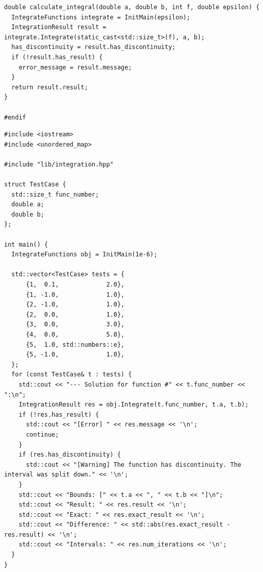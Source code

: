 \begin{lstlisting}[caption=Файл \texttt{integration.hpp}]
double calculate_integral(double a, double b, int f, double epsilon) {
  IntegrateFunctions integrate = InitMain(epsilon);
  IntegrationResult result = integrate.Integrate(static_cast<std::size_t>(f), a, b);
  has_discontinuity = result.has_discontinuity;
  if (!result.has_result) {
    error_message = result.message;
  }
  return result.result;
}

#endif
\end{lstlisting}

\begin{lstlisting}[caption=Файл \texttt{main.cpp}]
#include <iostream>
#include <unordered_map>

#include "lib/integration.hpp"

struct TestCase {
  std::size_t func_number;
  double a;
  double b;
};

int main() {
  IntegrateFunctions obj = InitMain(1e-6);

  std::vector<TestCase> tests = {
      {1,  0.1,             2.0},
      {1, -1.0,             1.0},
      {2, -1.0,             1.0},
      {2,  0.0,             1.0},
      {3,  0.0,             3.0},
      {4,  0.0,             5.0},
      {5,  1.0, std::numbers::e},
      {5, -1.0,             1.0},
  };
  for (const TestCase& t : tests) {
    std::cout << "--- Solution for function #" << t.func_number << ":\n";
    IntegrationResult res = obj.Integrate(t.func_number, t.a, t.b);
    if (!res.has_result) {
      std::cout << "[Error] " << res.message << '\n';
      continue;
    }
    if (res.has_discontinuity) {
      std::cout << "[Warning] The function has discontinuity. The interval was split down." << '\n';
    }
    std::cout << "Bounds: [" << t.a << ", " << t.b << "]\n";
    std::cout << "Result: " << res.result << '\n';
    std::cout << "Exact: " << res.exact_result << '\n';
    std::cout << "Difference: " << std::abs(res.exact_result - res.result) << '\n';
    std::cout << "Intervals: " << res.num_iterations << '\n';
  }
}
\end{lstlisting}